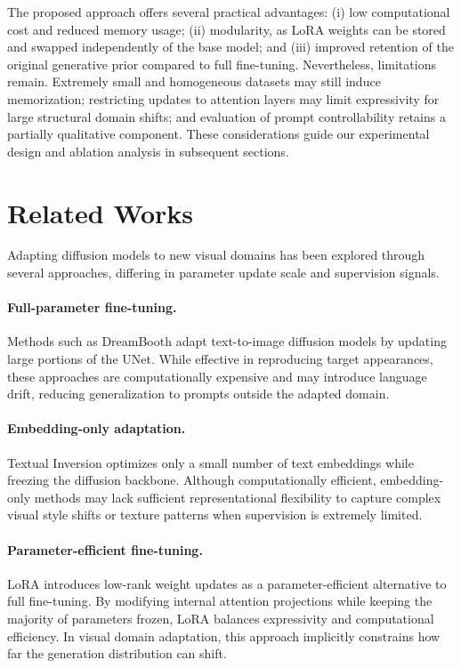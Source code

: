 \documentclass{article}
\begin{document}
The proposed approach offers several practical advantages: (i) low computational cost and reduced memory usage; (ii) modularity, as LoRA weights can be stored and swapped independently of the base model; and (iii) improved retention of the original generative prior compared to full fine-tuning. Nevertheless, limitations remain. Extremely small and homogeneous datasets may still induce memorization; restricting updates to attention layers may limit expressivity for large structural domain shifts; and evaluation of prompt controllability retains a partially qualitative component. These considerations guide our experimental design and ablation analysis in subsequent sections.


\section{Related Works}
\label{related_works}

Adapting diffusion models to new visual domains has been explored through several approaches, differing in parameter update scale and supervision signals.

\paragraph{Full-parameter fine-tuning.}
Methods such as DreamBooth \cite{ruiz2023dreamboothfinetuningtexttoimage} adapt text-to-image diffusion models by updating large portions of the UNet. While effective in reproducing target appearances, these approaches are computationally expensive and may introduce language drift, reducing generalization to prompts outside the adapted domain.

\paragraph{Embedding-only adaptation.}
Textual Inversion \cite{gal2022imageworthwordpersonalizing} optimizes only a small number of text embeddings while freezing the diffusion backbone. Although computationally efficient, embedding-only methods may lack sufficient representational flexibility to capture complex visual style shifts or texture patterns when supervision is extremely limited.

\paragraph{Parameter-efficient fine-tuning.}
LoRA \cite{hu2021loralowrankadaptationlarge} introduces low-rank weight updates as a parameter-efficient alternative to full fine-tuning. By modifying internal attention projections while keeping the majority of parameters frozen, LoRA balances expressivity and computational efficiency. In visual domain adaptation, this approach implicitly constrains how far the generation distribution can shift.
\end{document}
